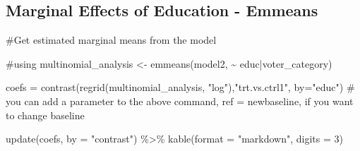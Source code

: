 \documentclass[
  letterpaper,
  DIV=11,
  numbers=noendperiod]{scrartcl}
\newenvironment{Shaded}{\begin{snugshade}}{\end{snugshade}}
\newcommand{\AttributeTok}[1]{\textcolor[rgb]{0.40,0.45,0.13}{#1}}
\newcommand{\CommentTok}[1]{\textcolor[rgb]{0.37,0.37,0.37}{#1}}
\newcommand{\DecValTok}[1]{\textcolor[rgb]{0.68,0.00,0.00}{#1}}
\newcommand{\FunctionTok}[1]{\textcolor[rgb]{0.28,0.35,0.67}{#1}}
\newcommand{\NormalTok}[1]{\textcolor[rgb]{0.00,0.23,0.31}{#1}}
\newcommand{\OtherTok}[1]{\textcolor[rgb]{0.00,0.23,0.31}{#1}}
\newcommand{\SpecialCharTok}[1]{\textcolor[rgb]{0.37,0.37,0.37}{#1}}
\newcommand{\StringTok}[1]{\textcolor[rgb]{0.13,0.47,0.30}{#1}}
\begin{document}
\subsection{Marginal Effects of Education -
Emmeans}\label{marginal-effects-of-education---emmeans}

\begin{Shaded}
\begin{Highlighting}[]
\CommentTok{\#Get estimated marginal means from the model}

\CommentTok{\#using }
\NormalTok{multinomial\_analysis }\OtherTok{\textless{}{-}} \FunctionTok{emmeans}\NormalTok{(model2, }\SpecialCharTok{\textasciitilde{}}\NormalTok{ educ}\SpecialCharTok{|}\NormalTok{voter\_category)}

\NormalTok{coefs }\OtherTok{=} \FunctionTok{contrast}\NormalTok{(}\FunctionTok{regrid}\NormalTok{(multinomial\_analysis, }\StringTok{"log"}\NormalTok{),}\StringTok{"trt.vs.ctrl1"}\NormalTok{,  }\AttributeTok{by=}\StringTok{"educ"}\NormalTok{)}
\CommentTok{\# you can add a parameter to the above command, ref = newbaseline, if you want to change baseline}

\FunctionTok{update}\NormalTok{(coefs, }\AttributeTok{by =} \StringTok{"contrast"}\NormalTok{) }\SpecialCharTok{\%\textgreater{}\%}
 \FunctionTok{kable}\NormalTok{(}\AttributeTok{format =} \StringTok{"markdown"}\NormalTok{, }\AttributeTok{digits =} \DecValTok{3}\NormalTok{)}
\end{Highlighting}
\end{Shaded}
\end{document}
